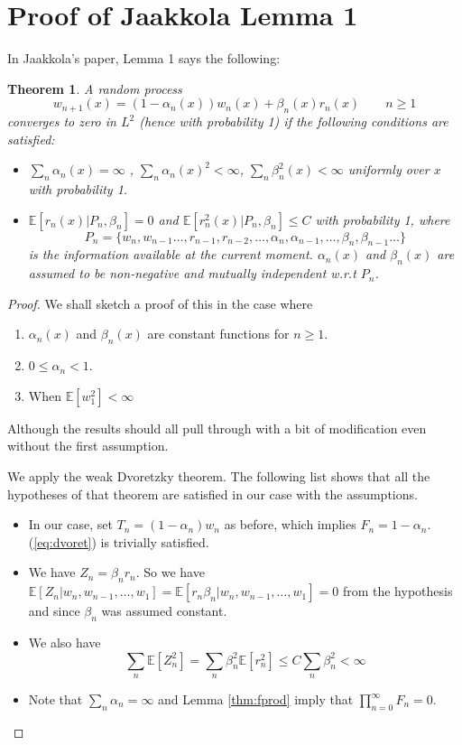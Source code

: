 \documentclass{article}
\def\E{\mathbb{E}}
\newtheorem{theorem}{Theorem}
\begin{document}
\section{Proof of Jaakkola Lemma 1}
In Jaakkola's paper, Lemma 1 says the following:
\begin{theorem}
A random process 
\[ 
w_{n+1}(x) = (1 - \alpha_n(x))w_{n}(x) + \beta_n(x)r_n(x) \qquad n \ge 1
\]
converges to zero in $L^2$ (hence with probability 1) if the following conditions are satisfied:
\begin{itemize}
    \item $\sum_{n} \alpha_n(x) = \infty$ , $\sum_n \alpha_n(x)^2 < \infty$, $\sum_n \beta_n^2(x) < \infty$ uniformly over $x$ with probability 1. 
    \item $\E\left[ r_n(x) | P_n , \beta_n\right] = 0$ and $\E\left[ r_n^2(x) | P_n, \beta_n \right] \le C$ with probability 1, where
    \[ P_n = \{w_n,w_{n-1}\dots,r_{n-1},r_{n-2},\dots,\alpha_n,\alpha_{n-1},\dots,\beta_n,\beta_{n-1}\dots \}\]
    is the information available at the current moment. $\alpha_n(x)$ and $\beta_n(x)$ are assumed to be non-negative and mutually independent w.r.t $P_n$.
\end{itemize}
\end{theorem}
\begin{proof}
We shall sketch a proof of this in the case where 
\begin{enumerate}
    \item $\alpha_n(x)$ and $\beta_n(x)$ are constant functions for $n \ge 1$.
    \item  $0 \le \alpha_n < 1$.
    \item When $\E\left[ w_1^2 \right] < \infty$
\end{enumerate}
Although the results should all pull through with a bit of modification even without the first assumption. 

We apply the weak Dvoretzky theorem. The following list shows that all the hypotheses of that theorem are satisfied in our case with the assumptions.  
\begin{itemize}
    \item In our case, set $T_n = (1 - \alpha_n)w_n$ as before, which implies $F_n = 1 - \alpha_n$. (\ref{eq:dvoret}) is trivially satisfied. 
    \item We have $Z_n = \beta_n r_n$. So we have $\E\left[Z_n | w_n,w_{n-1},\dots,w_1\right]= \E\left[r_n  \beta_n| w_n,w_{n-1},\dots,w_1\right] = 0$ from the hypothesis and since $\beta_n$ was assumed constant.
    \item We also have \[ \sum_n\E[Z_n^2] = \sum_n \beta_n^2 \E[r_n^2] \le C \sum_n \beta_n^2 < \infty \]
    \item Note that $\sum_n \alpha_n = \infty$ and Lemma \ref{thm:fprod} imply that $\prod_{n=0}^{\infty} F_n = 0$. 
    
\end{itemize}


\end{proof}
\end{document}
